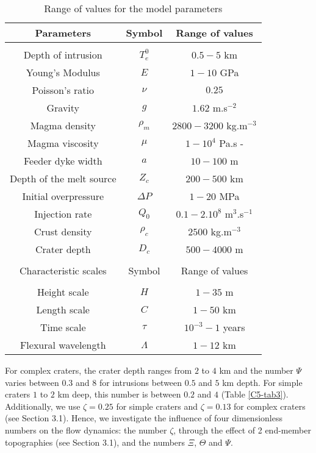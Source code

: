\begin{table}[h!]
  \caption{Range of values for the model parameters}
  \centering
  \begin{tabular}{c|c|c}
    \hline
    Parameters& Symbol & Range of values \\
    \hline
              &&\\
    Depth of intrusion & $T_{e}^0$ & $0.5-5$ km \\
    Young's Modulus & $E$ & $1-10$ GPa \\
    Poisson's ratio & $\nu$ & $0.25$ \\
    Gravity & $g$ & $1.62$ m.s$^{-2}$ \\
    Magma density & $\rho_{m}$ & $2800-3200$ kg.m$^{-3}$ \\
    Magma viscosity & $\mu $ & $1-10^{4}$ Pa.s -\\
    Feeder dyke width & $ a$ & $10-100$ m \\
    Depth of the melt source & $Z_{c}$ & $ 200-500$ km \\ 
    Initial overpressure & $\Delta P$ & $1-20$ MPa \\
    Injection rate & $Q_{0}$ &$0.1-2.10^8$ m$^{3}$.s$^{-1}$ \\
    Crust density & $\rho_{c}$ & $2500$ kg.m$^{-3}$ \\
    Crater depth & $D_{c}$ & $500-4000$ m \\
              &&\\
    \hline
    Characteristic scales & Symbol & Range of values \\
    \hline
              &&\\
    Height scale & $H$& $1-35$ m \\
    Length scale & $C$    & $1-50$ km \\
    Time scale & $\tau$ & $10^{-3}-1$ years \\
    Flexural wavelength & $\Lambda$ & $1-12$ km 
                                      \label{C5-tab2}
  \end{tabular} 
\end{table}
	 
For complex  craters, the crater depth  ranges from $2$ to  $4$ km and
the number $\Psi$ varies between  $0.3$ and $8$ for intrusions between
$0.5$ and $5$  km depth. For simple  craters $1$ to $2$  km deep, this
number is between $0.2$  and $4$ (Table \ref{C5-tab3}).  Additionally,
we use  $\zeta=0.25$ for simple  craters and $\zeta=0.13$  for complex
craters (see Section 3.1). Hence, we investigate the influence of four
dimensionless  numbers  on  the  flow dynamics:  the  number  $\zeta$,
through the effect of 2 end-member topographies (see Section 3.1), and
the numbers $\Xi$, $\Theta$ and $\Psi$.
	
